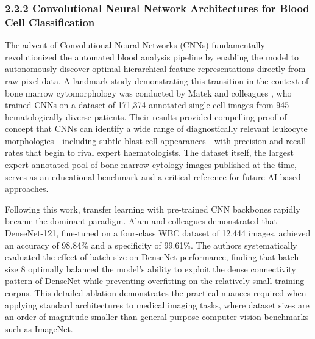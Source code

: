 \documentclass[11pt]{article}
\begin{document}
\subsubsection*{2.2.2 Convolutional Neural Network Architectures for Blood Cell Classification}

The advent of Convolutional Neural Networks (CNNs) fundamentally revolutionized the automated blood analysis pipeline by enabling the model to autonomously discover optimal hierarchical feature representations directly from raw pixel data. A landmark study demonstrating this transition in the context of bone marrow cytomorphology was conducted by Matek and colleagues \cite{matek2021}, who trained CNNs on a dataset of 171,374 annotated single-cell images from 945 hematologically diverse patients. Their results provided compelling proof-of-concept that CNNs can identify a wide range of diagnostically relevant leukocyte morphologies—including subtle blast cell appearances—with precision and recall rates that begin to rival expert haematologists. The dataset itself, the largest expert-annotated pool of bone marrow cytology images published at the time, serves as an educational benchmark and a critical reference for future AI-based approaches.

Following this work, transfer learning with pre-trained CNN backbones rapidly became the dominant paradigm. Alam and colleagues \cite{alam2022} demonstrated that DenseNet-121, fine-tuned on a four-class WBC dataset of 12,444 images, achieved an accuracy of 98.84\% and a specificity of 99.61\%. The authors systematically evaluated the effect of batch size on DenseNet performance, finding that batch size 8 optimally balanced the model's ability to exploit the dense connectivity pattern of DenseNet while preventing overfitting on the relatively small training corpus. This detailed ablation demonstrates the practical nuances required when applying standard architectures to medical imaging tasks, where dataset sizes are an order of magnitude smaller than general-purpose computer vision benchmarks such as ImageNet.
\end{document}
